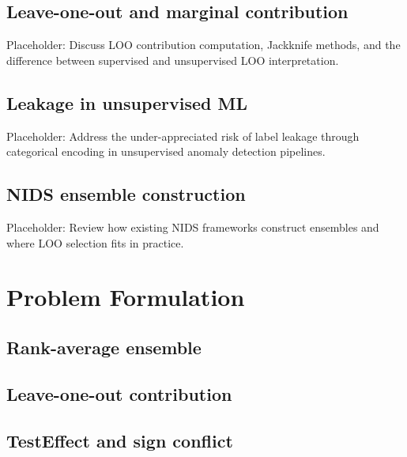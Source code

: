 \documentclass[preprint,12pt]{elsarticle}
\begin{document}
\subsection{Leave-one-out and marginal contribution}
Placeholder: Discuss LOO contribution computation, Jackknife methods, and the difference between supervised and unsupervised LOO interpretation.

\subsection{Leakage in unsupervised ML}
Placeholder: Address the under-appreciated risk of label leakage through categorical encoding in unsupervised anomaly detection pipelines.

\subsection{NIDS ensemble construction}
Placeholder: Review how existing NIDS frameworks construct ensembles and where LOO selection fits in practice.

\section{Problem Formulation}
\label{sec:formulation}

\subsection{Rank-average ensemble}

\subsection{Leave-one-out contribution}

\subsection{TestEffect and sign conflict}
\end{document}
